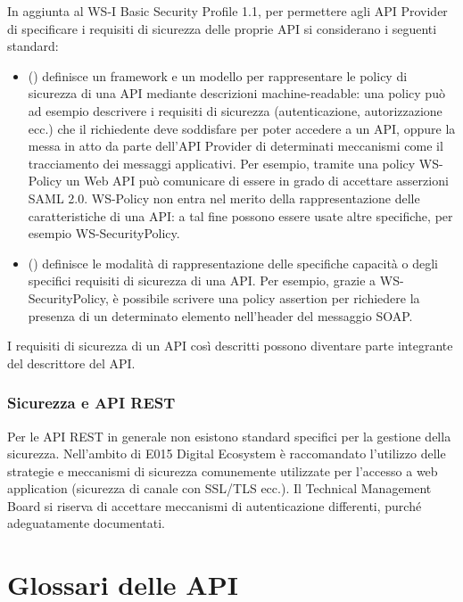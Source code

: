 \documentclass[letterpaper,10pt,italian]{sphinxmanual}
\begin{document}
In aggiunta al WS-I Basic Security Profile 1.1, per permettere agli API Provider di specificare i requisiti di sicurezza delle proprie API si considerano i seguenti standard:
\begin{itemize}
\item {} 
 () definisce un framework e un modello per rappresentare le policy di sicurezza di una API mediante descrizioni machine-readable: una policy può ad esempio descrivere i requisiti di sicurezza (autenticazione, autorizzazione ecc.) che il richiedente deve soddisfare per poter accedere a un API, oppure la messa in atto da parte dell’API Provider di determinati meccanismi come il tracciamento dei messaggi applicativi. Per esempio, tramite una policy WS-Policy un Web API può comunicare di essere in grado di accettare asserzioni SAML 2.0. WS-Policy non entra nel merito della rappresentazione delle caratteristiche di una API: a tal fine possono essere usate altre specifiche, per esempio WS-SecurityPolicy.

\item {} 
 () definisce le modalità di rappresentazione delle specifiche capacità o degli specifici requisiti di sicurezza di una API. Per esempio, grazie a WS-SecurityPolicy, è possibile scrivere una policy assertion per richiedere la presenza di un determinato elemento nell’header del messaggio SOAP.

\end{itemize}

I requisiti di sicurezza di un API così descritti possono diventare parte integrante del descrittore del API.


\subsubsection{Sicurezza e API REST}
\label{\detokenize{sez22:sicurezza-e-api-rest}}\label{\detokenize{sez22:sezione2242}}
Per le API REST in generale non esistono standard specifici per la gestione della sicurezza. Nell’ambito di E015 Digital Ecosystem è raccomandato l’utilizzo delle strategie e meccanismi di sicurezza comunemente utilizzate per l’accesso a web application (sicurezza di canale con SSL/TLS ecc.). Il Technical Management Board si riserva di accettare meccanismi di autenticazione differenti, purché adeguatamente documentati.


\section{Glossari delle API}
\label{\detokenize{sez23:glossari-delle-api}}\label{\detokenize{sez23:sezione23}}\label{\detokenize{sez23::doc}}
\end{document}
